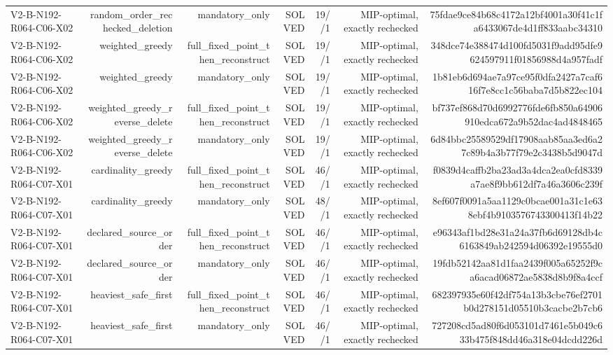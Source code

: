 {\begin{longtable}{lrrrrrr}
V2-B-N192-R064-C06-X02 & random\_order\_rechecked\_deletion & mandatory\_only & SOLVED & 19//1 & MIP-optimal, exactly rechecked & 75fdae9ce84b68c4172a12bf4001a30f41c1fa6433067de4d1ff833aabc34310 \\
V2-B-N192-R064-C06-X02 & weighted\_greedy & full\_fixed\_point\_then\_reconstruct & SOLVED & 19//1 & MIP-optimal, exactly rechecked & 348dce74e388474d100fd5031f9add95dfe9624597911f01856988d4a957fadf \\
V2-B-N192-R064-C06-X02 & weighted\_greedy & mandatory\_only & SOLVED & 19//1 & MIP-optimal, exactly rechecked & 1b81eb6d694ae7a97ce95f0dfa2427a7caf616f7e8cc1c56baba7d5b822ec104 \\
V2-B-N192-R064-C06-X02 & weighted\_greedy\_reverse\_delete & full\_fixed\_point\_then\_reconstruct & SOLVED & 19//1 & MIP-optimal, exactly rechecked & bf737ef868d70d6992776fde6fb850a64906910edca672a9b52dac4ad4848465 \\
V2-B-N192-R064-C06-X02 & weighted\_greedy\_reverse\_delete & mandatory\_only & SOLVED & 19//1 & MIP-optimal, exactly rechecked & 6d84bbc25589529df17908aab85aa3ed6a27c89b4a3b77f79e2c3438b5d9047d \\
V2-B-N192-R064-C07-X01 & cardinality\_greedy & full\_fixed\_point\_then\_reconstruct & SOLVED & 46//1 & MIP-optimal, exactly rechecked & f0839d4caffb2ba23ad3a4dca2ea0cfd8339a7ae8f9bb612df7a46a3606c239f \\
V2-B-N192-R064-C07-X01 & cardinality\_greedy & mandatory\_only & SOLVED & 48//1 & MIP-optimal, exactly rechecked & 8ef607f0091a5aa1129c0bcae001a31c1e638ebf4b9103576743300413f14b22 \\
V2-B-N192-R064-C07-X01 & declared\_source\_order & full\_fixed\_point\_then\_reconstruct & SOLVED & 46//1 & MIP-optimal, exactly rechecked & e96343af1bd28e31a24a37fb6d69128db4c6163849ab242594d06392e19555d0 \\
V2-B-N192-R064-C07-X01 & declared\_source\_order & mandatory\_only & SOLVED & 46//1 & MIP-optimal, exactly rechecked & 19fdb52142aa81d1faa2439f005a65252f9ca6acad06872ae5838d8b9f8a4ccf \\
V2-B-N192-R064-C07-X01 & heaviest\_safe\_first & full\_fixed\_point\_then\_reconstruct & SOLVED & 46//1 & MIP-optimal, exactly rechecked & 682397935e60f42df754a13b3cbe76ef2701b0d278151d05510b3cacbe2b7cb6 \\
V2-B-N192-R064-C07-X01 & heaviest\_safe\_first & mandatory\_only & SOLVED & 46//1 & MIP-optimal, exactly rechecked & 727208cd5ad80f6d053101d7461e5b049c633b475f848dd46a318e04dcdd226d \\

\end{longtable}}
